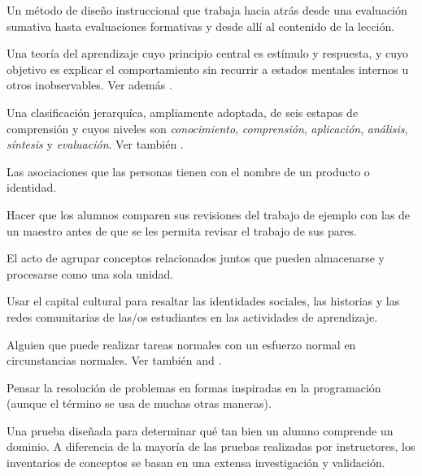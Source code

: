 \begin{description}
 Un método de diseño instruccional que
trabaja hacia atrás desde una evaluación sumativa hasta evaluaciones formativas y desde allí al contenido de la lección.

 Una teoría del aprendizaje cuyo principio central
es estímulo y respuesta, y cuyo objetivo es explicar el comportamiento sin recurrir
a estados mentales internos u otros inobservables. Ver
además .

 Una clasificación jerarquíca, ampliamente adoptada, 
de seis estapas de comprensión y cuyos niveles son \emph{conocimiento},
\emph{comprensión}, \emph{aplicación}, \emph{análisis}, \emph{síntesis} y
\emph{evaluación}. 
Ver también .

 Las asociaciones que las personas tienen con el nombre de un producto o
identidad.

 Hacer que los alumnos comparen sus 
revisiones del trabajo de ejemplo con las de un maestro antes de que 
se les permita revisar el trabajo de sus pares.

 El acto de agrupar conceptos relacionados juntos
que pueden almacenarse y procesarse como una sola unidad.


 Usar el capital cultural 
para resaltar las identidades sociales, las historias y las redes comunitarias de 
las/os estudiantes en las actividades de aprendizaje.




 Alguien que puede 
realizar tareas normales con un esfuerzo normal en circunstancias normales. Ver también
 and .

 Pensar la
resolución de problemas en formas inspiradas en la programación (aunque el término se usa de muchas
otras maneras).

 Una prueba diseñada para determinar 
qué tan bien un alumno comprende un dominio. A diferencia de la mayoría de las pruebas realizadas por instructores, 
los inventarios de conceptos se basan en una extensa investigación y validación.


\end{description}
